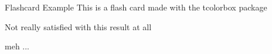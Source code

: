 \documentclass[10pt]{article}
\begin{document}
\begin{flashbx}{Flashcard Example}
This is a flash card made with the tcolorbox package


Not really satisfied with this result at all


meh ...
\end{flashbx}
\end{document}
